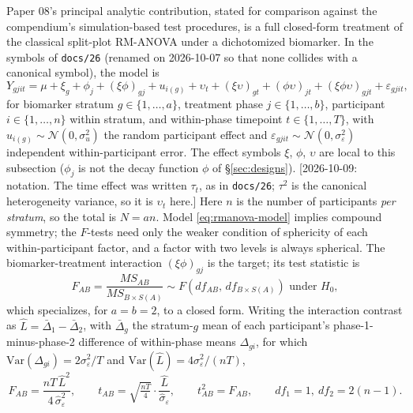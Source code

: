 \documentclass[11pt]{article}
\newcommand{\note}[1]{\textcolor{blue!60!black}{\small [#1]}}
\newcommand{\code}[1]{\texttt{#1}}
\begin{document}
Paper 08's principal analytic contribution, stated for comparison
against the compendium's simulation-based test procedures, is a full
closed-form treatment of the classical split-plot RM-ANOVA under a
dichotomized biomarker. In the symbols of \code{docs/26} (renamed on
2026-10-07 so that none collides with a canonical symbol), the model is
\begin{equation}
Y_{gjit} = \mu + \xi_g + \phi_j + (\xi\phi)_{gj} +
  u_{i(g)} + \upsilon_t + (\xi\upsilon)_{gt} + (\phi\upsilon)_{jt} +
  (\xi\phi\upsilon)_{gjt} + \varepsilon_{gjit},
\label{eq:rmanova-model}
\end{equation}
for biomarker stratum $g \in \{1,\dots,a\}$, treatment phase $j \in
\{1,\dots,b\}$, participant $i \in \{1,\dots,n\}$ within stratum, and
within-phase timepoint $t \in \{1,\dots,T\}$, with $u_{i(g)}\sim
\mathcal N(0,\sigma_u^2)$ the random participant effect and
$\varepsilon_{gjit}\sim \mathcal N(0,\sigma_\varepsilon^2)$ independent
within-participant error. The effect symbols $\xi$, $\phi$, $\upsilon$
are local to this subsection ($\phi_j$ is not the decay function
$\phi$ of \S\ref{sec:designs}). \note{2026-10-09: notation. The time
effect was written $\tau_t$, as in \code{docs/26}; $\tau^2$ is the
canonical heterogeneity variance, so it is $\upsilon_t$ here.} Here $n$ is the number of participants
\emph{per stratum}, so the total is $N = an$. Model
\eqref{eq:rmanova-model} implies compound symmetry; the $F$-tests need
only the weaker condition of sphericity of each within-participant
factor, and a factor with two levels is always spherical. The
biomarker-treatment interaction $(\xi\phi)_{gj}$ is the target; its
test statistic is
\begin{equation}
F_{AB} = \frac{MS_{AB}}{MS_{B\times S(A)}} \sim F(df_{AB},\,
  df_{B\times S(A)}) \text{ under } H_0,
\label{eq:rmanova-f}
\end{equation}
which specializes, for $a=b=2$, to a closed form. Writing the
interaction contrast as $\hat L = \bar\Delta_1 - \bar\Delta_2$, with
$\bar\Delta_g$ the stratum-$g$ mean of each participant's
phase-1-minus-phase-2 difference of within-phase means $\Delta_{gi}$,
for which $\mathrm{Var}(\Delta_{gi}) = 2\sigma_\varepsilon^2/T$ and
$\mathrm{Var}(\hat L) = 4\sigma_\varepsilon^2/(nT)$,
\begin{equation}
F_{AB} = \frac{nT\,\hat L^2}{4\,\hat\sigma_\varepsilon^2}, \qquad
  t_{AB} = \sqrt{\tfrac{nT}{4}}\cdot\frac{\hat L}{\hat\sigma_\varepsilon},
  \qquad t_{AB}^2 = F_{AB}, \qquad df_1 = 1,\ df_2 = 2(n-1).
\label{eq:rmanova-f-22}
\end{equation}
\end{document}
